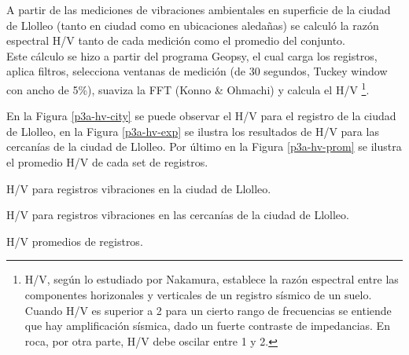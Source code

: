 A partir de las mediciones de vibraciones ambientales en superficie de la ciudad de Llolleo (tanto en ciudad como en ubicaciones aledañas) se calculó la razón espectral H/V tanto de cada medición como el promedio del conjunto. \\

Este cálculo se hizo a partir del programa Geopsy, el cual carga los registros, aplica filtros, selecciona ventanas de medición (de 30 segundos, Tuckey window con ancho de 5\%), suaviza la FFT (Konno \& Ohmachi) y calcula el H/V \footnote{H/V, según lo estudiado por Nakamura, establece la razón espectral entre las componentes horizonales y verticales de un registro sísmico de un suelo. Cuando H/V es superior a 2 para un cierto rango de frecuencias se entiende que hay amplificación sísmica, dado un fuerte contraste de impedancias. En roca, por otra parte, H/V debe oscilar entre 1 y 2.}.


En la Figura \ref{p3a-hv-city} se puede observar el H/V para el registro de la ciudad de Llolleo, en la Figura \ref{p3a-hv-exp} se ilustra los resultados de H/V para las cercanías de la ciudad de Llolleo. Por último en la Figura \ref{p3a-hv-prom} se ilustra el promedio H/V de cada set de registros.

\begin{images}[\label{p3a-hv-city}]{H/V para registros vibraciones en la ciudad de Llolleo.}
\end{images}

\begin{images}[\label{p3a-hv-exp}]{H/V para registros vibraciones en las cercanías de la ciudad de Llolleo.}
\end{images}

\begin{images}[\label{p3a-hv-prom}]{H/V promedios de registros.}
\end{images}

